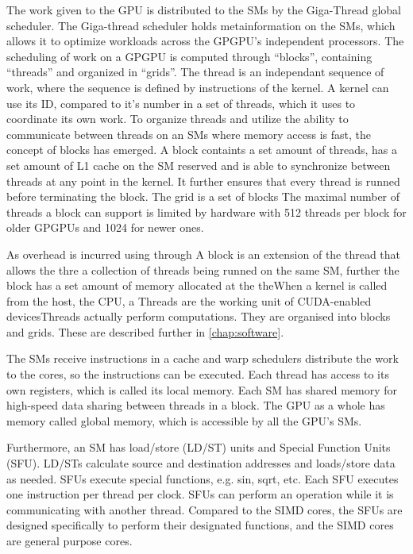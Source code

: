 The work given to the GPU is distributed to the SMs by the Giga-Thread global scheduler.
The Giga-thread scheduler holds metainformation on the SMs, which allows it to optimize workloads across the GPGPU's independent processors.
The scheduling of work on a GPGPU is computed through ``blocks'', containing ``threads'' and organized in ``grids''.
The thread is an independant sequence of work, where the sequence is defined by instructions of the kernel.
A kernel can use its ID, compared to it's number in a set of threads, which it uses to coordinate its own work.
To organize threads and utilize the ability to communicate between threads on an SMs where memory access is fast, the concept of blocks has emerged.
A block containts a set amount of threads, has a set amount of L1 cache on the SM reserved and is able to synchronize between threads at any point in the kernel.
It further ensures that every thread is runned before terminating the block.
The grid is a set of blocks
The maximal number of threads a block can support is limited by hardware with 512 threads per block for older GPGPUs and 1024 for newer ones.

As overhead is incurred using  through A block is an extension of the thread that allows the thre a collection of threads being runned on the same SM, further the block has a set amount of memory allocated at the
theWhen a kernel is called from the host, the CPU, a Threads are the working unit of CUDA-enabled devicesThreads actually perform computations.
They are organised into blocks and grids.
These are described further in \cref{chap:software}.

The SMs receive instructions in a cache and warp schedulers distribute the work to the cores, so the instructions can be executed.
Each thread has access to its own registers, which is called its local memory.
Each SM has shared memory for high-speed data sharing between threads in a block.
The GPU as a whole has memory called global memory, which is accessible by all the GPU's SMs.

Furthermore, an SM has load/store (LD/ST) units and Special Function Units (SFU).
LD/STs calculate source and destination addresses and loads/store data as needed.
SFUs execute special functions, e.g. sin, sqrt, etc.
Each SFU executes one instruction per thread per clock.
SFUs can perform an operation while it is communicating with another thread.
Compared to the SIMD cores, the SFUs are designed specifically to perform their designated functions, and the SIMD cores are general purpose cores.

